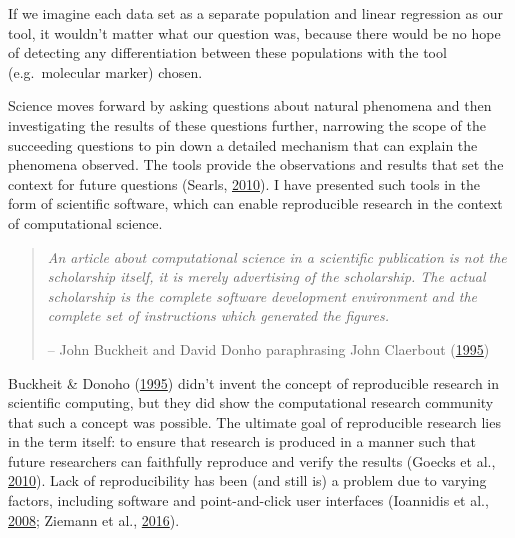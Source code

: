 \documentclass[double,11pt]{beavtex}
\begin{document}
  If we imagine each data set as a separate population and linear
  regression as our tool, it wouldn't matter what our question was,
  because there would be no hope of detecting any differentiation between
  these populations with the tool (e.g.~molecular marker) chosen.
  
  Science moves forward by asking questions about natural phenomena and
  then investigating the results of these questions further, narrowing the
  scope of the succeeding questions to pin down a detailed mechanism that
  can explain the phenomena observed. The tools provide the observations
  and results that set the context for future questions (Searls,
  \protect\hyperlink{ref-searls2010roots}{2010}). I have presented such
  tools in the form of scientific software, which can enable reproducible
  research in the context of computational science.
  
  \begin{quote}
  \emph{An article about computational science in a scientific publication
  is not the scholarship itself, it is merely advertising of the
  scholarship. The actual scholarship is the complete software development
  environment and the complete set of instructions which generated the
  figures.}
  
  -- John Buckheit and David Donho paraphrasing John Claerbout
  (\protect\hyperlink{ref-buckheit1995wavelab}{1995})
  \end{quote}
  
  Buckheit \& Donoho (\protect\hyperlink{ref-buckheit1995wavelab}{1995})
  didn't invent the concept of reproducible research in scientific
  computing, but they did show the computational research community that
  such a concept was possible. The ultimate goal of reproducible research
  lies in the term itself: to ensure that research is produced in a manner
  such that future researchers can faithfully reproduce and verify the
  results (Goecks et al., \protect\hyperlink{ref-goecks2010galaxy}{2010}).
  Lack of reproducibility has been (and still is) a problem due to varying
  factors, including software and point-and-click user interfaces
  (Ioannidis et al.,
  \protect\hyperlink{ref-ioannidis2008repeatability}{2008}; Ziemann et
  al., \protect\hyperlink{ref-ziemann2016gene}{2016}).
  
\end{document}
